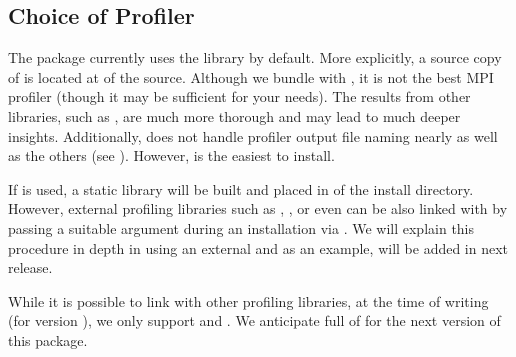 \subsection{Choice of Profiler}

The  package currently uses the  library by default.  
More explicitly, a source copy of  is located at 
 of the  source. Although we bundle  with , it is not the best MPI profiler (though it may be sufficient for your needs).  The results from other libraries, such as , are much more thorough and may lead to much deeper insights.  Additionally,  does not handle profiler output file naming nearly as well as the others (see ).  However,  is the easiest to install. 

If  is used, a
static library will be built and placed in 
of the  install directory.  However, external profiling 
libraries such as , , or even   can be also 
linked with  by passing a suitable  
argument during an installation via . We will explain this 
procedure in depth in  using an external  and 
as an example,  will be added in next release.

While it is possible to link with other profiling libraries, at the time of 
writing (for version \profversion), we only support  and .  We anticipate full 
of  for the next version of this package.